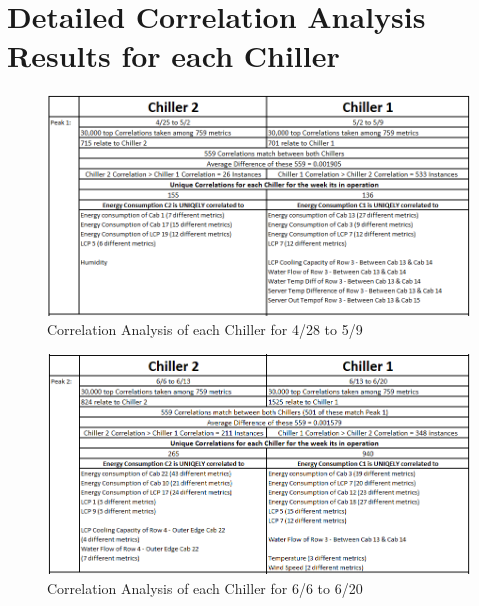 \documentclass[12pt]{scrartcl}
\begin{document}
\section{Detailed Correlation Analysis Results for each Chiller}
\label{sec:[Chiller Correlation Analysis Results]}

\begin{figure}[H]
  \caption{Correlation Analysis of each Chiller for 4/28 to 5/9}
  \label{fig:peak1chillercorrelation}
  \centering
    \includegraphics[scale=0.50]{peak1chillercorrelation}
\end{figure}   

\begin{figure}[H]
  \caption{Correlation Analysis of each Chiller for 6/6 to 6/20}
  \label{fig:peak2chillercorrelation}
  \centering
    \includegraphics[scale=0.50]{peak2chillercorrelation}
\end{figure}
\end{document}

